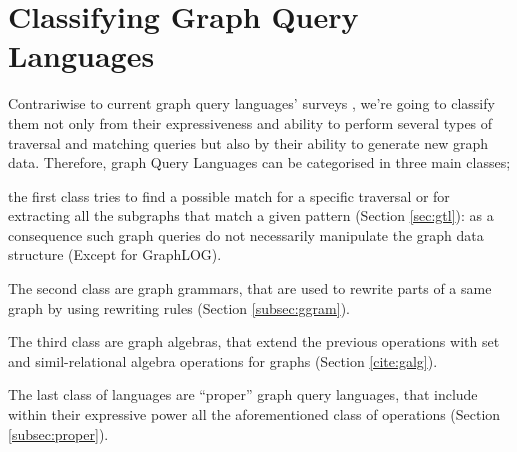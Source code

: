 \section{Classifying Graph Query Languages}\label{sec:dbqlang}

%

Contrariwise to current graph query languages' surveys \cite{AnglesABHRV17}, we're going to classify them not only from their expressiveness and ability to perform several types of traversal and matching queries but also by their ability to generate new graph data. Therefore, graph Query Languages can be categorised in three main classes;
\begin{alphalist}
	\item the first class  tries to find a
	possible match for a specific traversal  or for extracting all the subgraphs that match a given pattern (Section \vref{sec:gtl}): as a consequence such graph
	queries do not necessarily manipulate the graph data structure (Except for GraphLOG).
	\item The second class are graph grammars, that are used to rewrite parts of a same graph by using rewriting rules (Section \vref{subsec:ggram}).
	\item The third class are graph algebras, that extend the previous operations with set and simil-relational algebra operations for graphs (Section \vref{cite:galg}).
	\item The last class of languages are ``proper'' graph query languages, that include within their expressive power all the aforementioned class of operations (Section \vref{subsec:proper}).
\end{alphalist}

